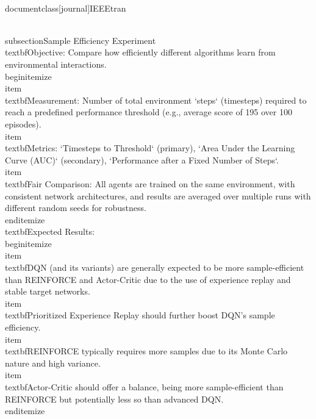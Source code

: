 \\documentclass[journal]{IEEEtran}
\begin{document}
\\subsection{Sample Efficiency Experiment}
\\textbf{Objective}: Compare how efficiently different algorithms learn from environmental interactions.
\\begin{itemize}
    \\item \\textbf{Measurement}: Number of total environment `steps` (timesteps) required to reach a predefined performance threshold (e.g., average score of 195 over 100 episodes).
    \\item \\textbf{Metrics}: `Timesteps to Threshold` (primary), `Area Under the Learning Curve (AUC)` (secondary), `Performance after a Fixed Number of Steps`.
    \\item \\textbf{Fair Comparison}: All agents are trained on the same environment, with consistent network architectures, and results are averaged over multiple runs with different random seeds for robustness.
\\end{itemize}
\\textbf{Expected Results}:
\\begin{itemize}
    \\item \\textbf{DQN (and its variants)} are generally expected to be more sample-efficient than REINFORCE and Actor-Critic due to the use of experience replay and stable target networks.
    \\item \\textbf{Prioritized Experience Replay} should further boost DQN's sample efficiency.
    \\item \\textbf{REINFORCE} typically requires more samples due to its Monte Carlo nature and high variance.
    \\item \\textbf{Actor-Critic} should offer a balance, being more sample-efficient than REINFORCE but potentially less so than advanced DQN.
\\end{itemize}
\end{document}
